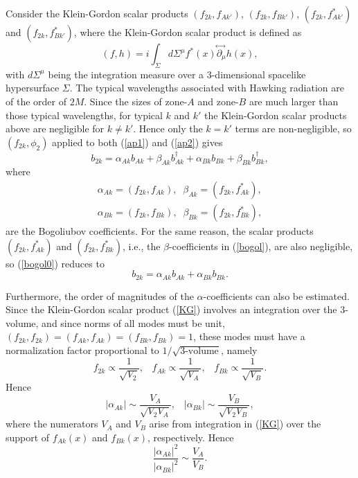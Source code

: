\documentclass[12pt]{article}
\begin{document}
Consider the Klein-Gordon scalar products $(f_{2k},f_{Ak'})$, $(f_{2k},f_{Bk'})$,
$(f_{2k},f_{Ak'}^*)$ and $(f_{2k},f_{Bk'}^*)$, where the Klein-Gordon scalar product is defined as \cite{bd}
\begin{equation}\label{KG}
 (f,h)=i\int_{\Sigma} d\Sigma^{\mu}f^*(x)  \!\stackrel{\leftrightarrow\;}{ \partial_\mu }\! h(x) ,
\end{equation}
with $d\Sigma^{\mu}$ being the integration measure over a 3-dimensional spacelike hypersurface $\Sigma$.
The typical wavelengths associated with Hawking radiation are of the order of $2M$.
Since the sizes of zone-$A$ and zone-$B$ are much larger than those typical wavelengths,
for typical $k$ and $k'$ the Klein-Gordon scalar products above are negligible for $k\neq k'$.
Hence only the $k=k'$ terms are non-negligible,  
so $(f_{2k}, \phi_2)$ applied to both (\ref{ap1}) and (\ref{ap2}) gives
\begin{equation}\label{bogol0}
 b_{2k}= \alpha_{Ak}b_{Ak} + \beta_{Ak}b_{Ak}^\dagger + \alpha_{Bk}b_{Bk} + \beta_{Bk}b_{Bk}^\dagger ,
\end{equation}
where
\begin{eqnarray}\label{bogol}
 \alpha_{Ak}=(f_{2k},f_{Ak}), \;\; \beta_{Ak} = (f_{2k},f_{Ak}^*) ,
\nonumber \\
\alpha_{Bk}=(f_{2k},f_{Bk}), \;\; \beta_{Bk} = (f_{2k},f_{Bk}^*) ,
\end{eqnarray}
are the Bogoliubov coefficients.
For the same reason, the scalar products $(f_{2k},f_{Ak}^*)$ and $(f_{2k},f_{Bk}^*)$, i.e., 
the $\beta$-coefficients in (\ref{bogol}), are also negligible, so (\ref{bogol0}) reduces to
\begin{equation}\label{bogol1}
 b_{2k}= \alpha_{Ak}b_{Ak} + \alpha_{Bk}b_{Bk}. 
\end{equation}

Furthermore, the order of magnitudes of the $\alpha$-coefficients can also be estimated.
Since the Klein-Gordon scalar product (\ref{KG}) involves an integration over the 3-volume, and since 
norms of all modes must be unit, $(f_{2k},f_{2k})=(f_{Ak},f_{Ak})=(f_{Bk},f_{Bk})=1$, 
these modes must have a normalization factor proportional to $1/\sqrt{\text{3-volume}}$, namely
\begin{equation}
 f_{2k}\propto \frac{1}{\sqrt{V_2}} , \;\;\; f_{Ak}\propto \frac{1}{\sqrt{V_A}} , \;\;\; f_{Bk}\propto \frac{1}{\sqrt{V_B}} . 
\end{equation}
Hence
\begin{equation}
 |\alpha_{Ak}| \sim \frac{V_A}{\sqrt{V_2V_A}}, \;\;\; |\alpha_{Bk}| \sim \frac{V_B}{\sqrt{V_2V_B}} , 
\end{equation}
where the numerators $V_A$ and $V_B$ arise from integration in (\ref{KG}) over the support of $f_{Ak}(x)$ and $f_{Bk}(x)$, 
respectively. Hence
\begin{equation}\label{aVAB}
 \frac{|\alpha_{Ak}|^2 }{|\alpha_{Bk}|^2} \sim \frac{V_A}{V_B} .
\end{equation}
\end{document}
